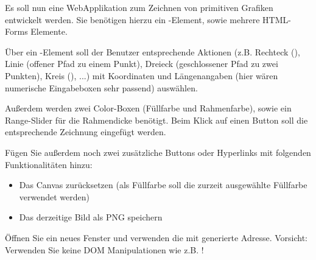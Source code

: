 %
\par Es soll nun eine WebApplikation zum Zeichnen von primitiven Grafiken entwickelt werden. Sie benötigen hierzu ein -Element, sowie mehrere HTML-Forms Elemente.
%
\par Über ein -Element soll der Benutzer entsprechende Aktionen (z.B. Rechteck (), Linie (offener Pfad zu einem Punkt), Dreieck (geschlossener Pfad zu zwei Punkten), Kreis (), ...) mit Koordinaten und Längenangaben (hier wären numerische Eingabeboxen sehr passend) auswählen.
%
\par Außerdem werden zwei Color-Boxen (Füllfarbe und Rahmenfarbe), sowie ein Range-Slider für die Rahmendicke benötigt. Beim Klick auf einen Button soll die entsprechende Zeichnung eingefügt werden.
%
\par Fügen Sie außerdem noch zwei zusätzliche Buttons oder Hyperlinks mit folgenden Funktionalitäten hinzu:
%
\begin{itemize}
\item Das Canvas zurücksetzen (als Füllfarbe soll die zurzeit ausgewählte Füllfarbe verwendet werden)
\item Das derzeitige Bild als PNG speichern
\end{itemize}
%
%
\par Öffnen Sie ein neues Fenster und verwenden die mit  generierte Adresse. Vorsicht: Verwenden Sie keine DOM Manipulationen wie z.B. !